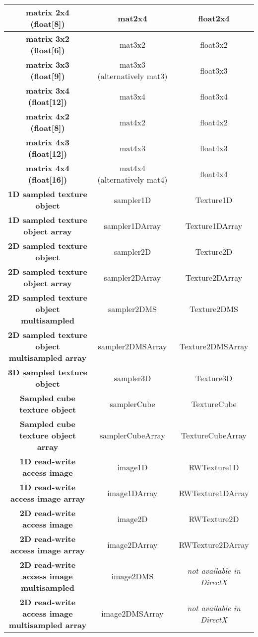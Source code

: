 \documentclass{article}
\begin{document}
\begin{table}[hp]
{\begin{tabular} { | c | c | c | }
	\textbf{matrix 2x4 (float[8])} & mat2x4 & float2x4 \\ \hline
	\textbf{matrix 3x2 (float[6])} & mat3x2 & float3x2 \\ \hline
	\textbf{matrix 3x3 (float[9])} & mat3x3 (alternatively mat3) & float3x3 \\ \hline
	\textbf{matrix 3x4 (float[12])} & mat3x4 & float3x4 \\ \hline
	\textbf{matrix 4x2 (float[8])} & mat4x2 & float4x2 \\ \hline
	\textbf{matrix 4x3 (float[12])} & mat4x3 & float4x3 \\ \hline
	\textbf{matrix 4x4 (float[16])} & mat4x4 (alternatively mat4) & float4x4 \\ \hline
	\textbf{1D sampled texture object} & sampler1D & Texture1D \\ \hline
	\textbf{1D sampled texture object array} & sampler1DArray & Texture1DArray \\ \hline
	\textbf{2D sampled texture object} & sampler2D & Texture2D \\ \hline
	\textbf{2D sampled texture object array} & sampler2DArray & Texture2DArray \\ \hline
	\textbf{2D sampled texture object multisampled} & sampler2DMS & Texture2DMS \\ \hline
	\textbf{2D sampled texture object multisampled array} & sampler2DMSArray & Texture2DMSArray \\ \hline
	\textbf{3D sampled texture object} & sampler3D & Texture3D \\ \hline
	\textbf{Sampled cube texture object} & samplerCube & TextureCube \\ \hline
	\textbf{Sampled cube texture object array} & samplerCubeArray & TextureCubeArray \\ \hline
	\textbf{1D read-write access image} & image1D & RWTexture1D \\ \hline
	\textbf{1D read-write access image array} & image1DArray & RWTexture1DArray \\ \hline
	\textbf{2D read-write access image} & image2D & RWTexture2D \\ \hline
	\textbf{2D read-write access image array} & image2DArray & RWTexture2DArray \\ \hline
	\textbf{2D read-write access image multisampled} & image2DMS & \textit{not available in DirectX} \\ \hline
	\textbf{2D read-write access image multisampled array} & image2DMSArray & \textit{not available in DirectX} \\ \hline

\end{tabular}}
\end{table}
\end{document}
